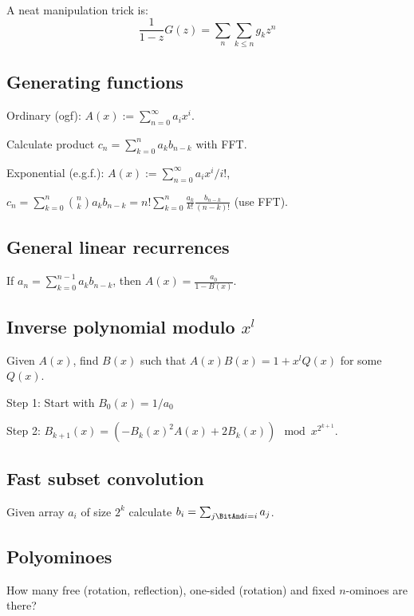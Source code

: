       \ 

      A neat manipulation trick is:
      \begin{equation*}
        \frac{1}{1-z}G(z) = \sum_{n}\sum_{k\leq n}g_kz^n
      \end{equation*}

	\subsection{Generating functions}
	Ordinary (ogf): $A(x) := \sum_{n=0}^{\infty} a_i x^i$.

	Calculate product $c_n = \sum_{k=0}^{n} a_k b_{n-k}$ with FFT.

	Exponential (e.g.f.): $A(x) := \sum_{n=0}^{\infty} a_i x^i/i!$,

	$c_n = \sum_{k=0}^{n} \binom{n}{k} a_k b_{n-k} = n! \sum_{k=0}^{n} \frac{a_k}{k!} \frac{b_{n-k}}{(n-k)!}$ (use FFT).

\subsection{General linear recurrences}
	If $a_n = \sum_{k=0}^{n-1} a_k b_{n-k}$, then $A(x) = \frac{a_0}{1-B(x)}$.

\subsection{Inverse polynomial modulo $x^l$}
	Given $A(x)$, find $B(x)$ such that $A(x)B(x) = 1 + x^l Q(x)$ for some $Q(x)$.

	Step 1: Start with $B_0(x) = 1/a_0$

	Step 2: $B_{k+1}(x) = (-B_k(x)^2 A(x) + 2 B_k(x)) \mod x^{2^{k+1}}$.

\subsection{Fast subset convolution}
	Given array $a_i$ of size $2^k$ calculate $b_i = \sum_{j \BitAnd i = i} a_j$.
	

\newpage

\subsection{Polyominoes} How many free (rotation, reflection), one-sided (rotation) and fixed $n$-ominoes are there?
      




